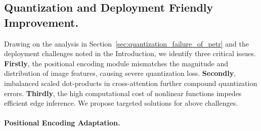 \subsection{Quantization and Deployment Friendly Improvement.}
\label{sec:3.3}

Drawing on the analysis in Section~\ref{sec:quantization_failure_of_petr} and the deployment challenges noted in the Introduction, we identify three critical issues. \textbf{Firstly}, the positional encoding module mismatches the magnitude and distribution of image features, causing severe quantization loss. \textbf{Secondly}, imbalanced scaled dot-products in cross-attention further compound quantization errors. \textbf{Thirdly}, the high computational cost of nonlinear functions impedes efficient edge inference. We propose targeted solutions for above challenges.

\vspace{-6mm}
\paragraph{Positional Encoding Adaptation.}

